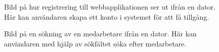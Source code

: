 \documentclass[a4paper,12pt]{article}
\begin{document}
 \begin{figure}[H]
   \centering
   \caption{Bild på hur registrering till webbapplikationen ser ut ifrån en dator. Här kan användaren skapa ett konto i systemet för att få tillgång.}
   \label{fig:comp_sign_in}
 \end{figure}

 \begin{figure}[H]
   \centering
   \caption{Bild på en sökning av en medarbetare ifrån en dator. Här kan användaren med hjälp av sökfältet söka efter medarbetare.}
   \label{fig:comp_search}
 \end{figure}
 \leavevmode
\end{document}
